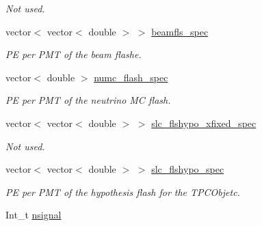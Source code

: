 \begin{DoxyCompactItemize}
\begin{DoxyCompactList}\small\item\em Not used. \end{DoxyCompactList}\item 
\hypertarget{classUBXSecEvent_a672e817e5a574c0a1ff50ec81862bc1f}{vector$<$ vector$<$ double $>$ $>$ \hyperlink{classUBXSecEvent_a672e817e5a574c0a1ff50ec81862bc1f}{beamfls\-\_\-spec}}\label{classUBXSecEvent_a672e817e5a574c0a1ff50ec81862bc1f}

\begin{DoxyCompactList}\small\item\em P\-E per P\-M\-T of the beam flashe. \end{DoxyCompactList}\item 
\hypertarget{classUBXSecEvent_aa51dba44fd0d9dcfbeb4c455b73debbd}{vector$<$ double $>$ \hyperlink{classUBXSecEvent_aa51dba44fd0d9dcfbeb4c455b73debbd}{numc\-\_\-flash\-\_\-spec}}\label{classUBXSecEvent_aa51dba44fd0d9dcfbeb4c455b73debbd}

\begin{DoxyCompactList}\small\item\em P\-E per P\-M\-T of the neutrino M\-C flash. \end{DoxyCompactList}\item 
\hypertarget{classUBXSecEvent_aff42f5975ca8b7c22f21023ffe8cf2c9}{vector$<$ vector$<$ double $>$ $>$ \hyperlink{classUBXSecEvent_aff42f5975ca8b7c22f21023ffe8cf2c9}{slc\-\_\-flshypo\-\_\-xfixed\-\_\-spec}}\label{classUBXSecEvent_aff42f5975ca8b7c22f21023ffe8cf2c9}

\begin{DoxyCompactList}\small\item\em Not used. \end{DoxyCompactList}\item 
\hypertarget{classUBXSecEvent_aa82aa9b73994eae31d0f7ab0f47f23fa}{vector$<$ vector$<$ double $>$ $>$ \hyperlink{classUBXSecEvent_aa82aa9b73994eae31d0f7ab0f47f23fa}{slc\-\_\-flshypo\-\_\-spec}}\label{classUBXSecEvent_aa82aa9b73994eae31d0f7ab0f47f23fa}

\begin{DoxyCompactList}\small\item\em P\-E per P\-M\-T of the hypothesis flash for the T\-P\-C\-Objetc. \end{DoxyCompactList}\item 
\hypertarget{classUBXSecEvent_a6aff7f0ac0e26d4b80b117cb5797f1ab}{Int\-\_\-t \hyperlink{classUBXSecEvent_a6aff7f0ac0e26d4b80b117cb5797f1ab}{nsignal}}\label{classUBXSecEvent_a6aff7f0ac0e26d4b80b117cb5797f1ab}


\end{DoxyCompactItemize}

